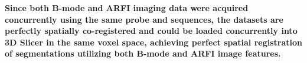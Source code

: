 \textbf{Since both B-mode and ARFI imaging data were acquired concurrently using the same probe and sequences, the datasets are perfectly spatially co-registered and could be loaded concurrently into 3D Slicer in the same voxel space, achieving perfect spatial registration of segmentations utilizing both B-mode and ARFI image features.}
